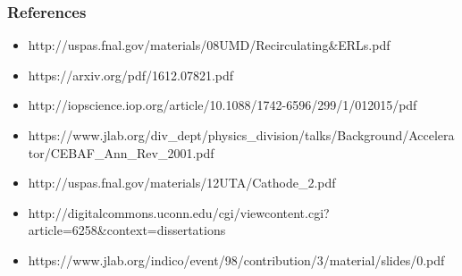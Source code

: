 \documentclass{beamer}
\begin{document}
\begin{frame}
\frametitle{References}
\begin{itemize}
\item http://uspas.fnal.gov/materials/08UMD/Recirculating&ERLs.pdf
\item https://arxiv.org/pdf/1612.07821.pdf
\item http://iopscience.iop.org/article/10.1088/1742-6596/299/1/012015/pdf
\item https://www.jlab.org/div_dept/physics_division/talks/Background/Accelerator/CEBAF_Ann_Rev_2001.pdf
\item http://uspas.fnal.gov/materials/12UTA/Cathode_2.pdf
\item http://digitalcommons.uconn.edu/cgi/viewcontent.cgi?article=6258&context=dissertations
\item https://www.jlab.org/indico/event/98/contribution/3/material/slides/0.pdf
\end{itemize}

\end{frame}

\end{document}
